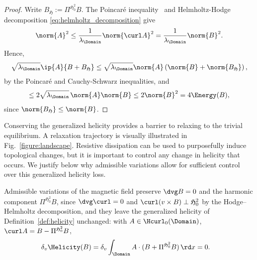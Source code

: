 \documentclass[%
 reprint,
 superscriptaddress,
 amsmath,amssymb,
 aps, nofootinbib, floatfix]{revtex4-2}
\begin{document}
\begin{proof}
    Write $B_{\mathfrak H} := \Pi^{{\mathfrak H}^2_0} B.$
    The Poincaré inequality~\citep[Proposition 4.1]{ern_discrete_2024} and Helmholtz-Hodge decomposition \eqref{eq:helmholtz_decomposition} give
    \begin{align}
    \label{eq:poincare_ineq_AandB}
        \norm{A}^2
          \leq \frac{1}{\lambda_\Domain} \norm{\curl A}^2
        = \frac{1}{\lambda_\Domain} \norm{B}^2.
    \end{align}
    Hence,
    \begin{align}\notag
        \sqrt{\lambda_\Domain} \ip{A}{B + B_{\mathfrak H}} \leq \sqrt{\lambda_\Domain} \norm{A} \left( \norm{B} + \norm{B_{\mathfrak H}} \right), 
        \end{align}
      by the Poincaré and Cauchy-Schwarz inequalities, and
        \begin{align}
        \notag
        \leq 2 \sqrt{\lambda_\Domain} \, \norm{A} \norm{B} \leq 2 \norm{B}^2  = 4 \Energy(B),
    \end{align}
    since $\norm{B_{\mathfrak H}} \leq \norm{B}$.
\end{proof}

Conserving the generalized helicity provides a barrier to relaxing to the trivial equilibrium. A relaxation trajectory is visually illustrated in  Fig.~\ref{figure:landscape}. Resistive dissipation can be used to purposefully induce topological changes, but it is important to control any change in helicity that occurs. We justify below why admissible variations allow for sufficient control over this generalized helicity loss. 

\begin{proposition}
\label{prop:AdmissibleVariationsPreserveDivergenceAndHelicity}
    Admissible variations of the magnetic field preserve $\dvg B = 0$ and the harmonic component $\Pi^{{\mathfrak H}^2_0} B$, since $\dvg \curl = 0$ and $\curl (v \times B) \perp \mathfrak H^2_0$ by the Hodge--Helmholtz decomposition, and they leave the generalized helicity of Definition~\ref{def:helicity} unchanged: with $A \in \Hcurl_0(\Domain)$, $\curl A = B - \Pi^{\mathfrak H^2_0} B$,
    \begin{align}
        \delta_v \Helicity(B) &= \delta_v \int_\Domain A \cdot (B + \Pi^{{\mathfrak H}^2_0} B) \, \rd x = 0.
    \end{align}
\end{proposition}
\end{document}
